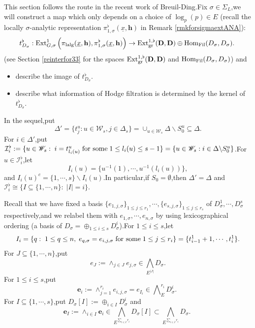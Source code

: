 \documentclass[10pt]{article}
\newcommand{\fil}{{\rm Fil}}
\newcommand{\homo}{{\rm Hom}}
\newcommand{\ext}{{\rm Ext}}
\newcommand{\lalg}{{\rm lalg}}
\newcommand{\gr}{{\rm gr}}
\newcommand{\Dpik}{{\mathbf{D}}}
\newcommand{\be}{{\mathbf{e}}}
\newcommand{\bh}{{\mathbf{h}}}
\newcommand{\cI}{\mathcal I}
\newcommand{\sW}{\mathscr W}
\begin{document}
This section follows the route in the recent work \cite[Section 2.4]{BDcritical25} of Breuil-Ding.\;Fix $\sigma\in \Sigma_L$,\;we will construct a map which only depends  on a choice of $\log_p(p)\in E$  (recall the locally $\sigma$-analytic representation  $\pi^{\flat}_{1,\sigma}(\underline{x},\bh)$  in Remark \ref{rmkforsigmaextANA}):
	\begin{equation}\label{constructionvarphi}
	\begin{aligned}
		t^{\flat}_{D_{\sigma}}:\ext^1_{G,\sigma}\left(\pi_{\lalg}(\underline{x},\bh),\pi^{\flat}_{1,\sigma}(\underline{x},\bh)\right)\rightarrow \ext^{1,\flat}_{\gr}({\Dpik},{\Dpik})\oplus\homo_{\fil}(D_{\sigma},D_{\sigma}).\;
	\end{aligned}
\end{equation}
(see Section \ref{reinterfor33} for the spaces $\ext^{1,\flat}_{\gr}({\Dpik},{\Dpik})$ and $\homo_{\fil}(D_{\sigma},D_{\sigma})$) and 
\begin{itemize}
	\item[(a)] describe the image of $t^{\flat}_{D_{\sigma}}$.\;
	\item[(b)] describe what information of  Hodge filtration  is determined by the kernel of  $t^{\flat}_{D_{\sigma}}$.\;
\end{itemize}
In the sequel,\;put
\[\Delta'=\{t_j^u:u\in \sW_s,j\in \Delta_s\}=\cup_{u\in \sW_s}\Delta\backslash S_0^u\subseteq\Delta.\]
For $i\in\Delta'$,\;put $\cI_{i}^{\flat}:=\{u\in \sW_s:\;i=t_{l_i(u)}^u \text{\;for some\;} 1\leq l_i(u)\leq s-1\}=\{u\in \sW_s:i\in \Delta\backslash S_0^u\}$.\;For $u\in \cI_{i}^{\flat}$,\;let 
\[I_i(u)=\{u^{-1}(1),\cdots,u^{-1}(l_i(u))\},\]
and $I_i(u)^c=\{1,\cdots,s\}\backslash I_i(u)$.\;In particular,\;if $S_0=\emptyset$,\;then $\Delta'=\Delta$ and $\cI_{i}^{\flat}\cong \{I\subseteq\{1,\cdots,n\}:\;|I|=i\}$.\;


Recall that we have fixed a basis $\{e_{1,j,\sigma}\}_{1\leq j\leq r_1},\cdots,\{e_{s,j,\sigma}\}_{1\leq j\leq r_s}$ of $D_{\sigma}^1,\cdots,D_{\sigma}^s$ respectively,\;and we relabel them with $e_{1,\sigma},\cdots,e_{n,\sigma}$  by using lexicographical ordering (a basis of $D_{\sigma}=\oplus_{1\leq i\leq s}D_{\sigma}^i$).\;For $1\leq i\leq s$,\;let 
\[I_i=\{q:\;1\leq q\leq n,\;e_{q,\sigma}=e_{i,j,\sigma} \text{\;for some\;} 1\leq j\leq r_i\}=\{t_{i-1}^1+1,\cdots,t_i^1\}.\]
For $J\subseteq \{1,\cdots,n\}$,\;put
\[e_J:=\wedge_{j\in J}e_{j,\sigma}\in \bigwedge_E\nolimits^{\!|J|}\!D_{\sigma}.\]
For $1\leq i\leq s$,\;put 
\[\be_i:=\wedge_{j=1}^{r_i}e_{i,j,\sigma}=e_{I_i}\in\bigwedge\nolimits_E^{\!r_i}\!D^i_{\sigma}.\;\]
For $I\subseteq \{1,\cdots,s\}$,\;put $D_{\sigma}[I]:=\oplus_{i\in I}D_{\sigma}^i$ and 
\[\be_I:=\wedge_{i\in I}\be_i\in \bigwedge_E\nolimits^{\!\sum_{i\in I}r_i}\!D_{\sigma}[I]\subset \bigwedge_E\nolimits^{\!\sum_{i\in I}r_i}\!D_{\sigma}.\;\]
\end{document}
